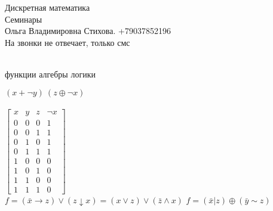 \documentclass[a4paper]{article}
\begin{document}
    \begin{center} 
        \LARGE Дискретная математика\\
        \LARGE Семинары\\
        Ольга Владимировна Стихова. +79037852196\\
        На звонки не отвечает, только смс
    \end{center}
    \newpage
    \begin{center}
        \\
         функции алгебры логики
    \end{center}
    $(x+ \lnot y)~(z\oplus\lnot x)$\\\\
    $\begin{bmatrix}
        x&y&z&\lnot x\\
        0&0&0&1\\
        0&0&1&1\\
        0&1&0&1\\
        0&1&1&1\\
        1&0&0&0\\
        1&0&1&0\\
        1&1&0&0\\
        1&1&1&0
    \end{bmatrix}$\\
    $f=(\bar x\to z)\vee(z \downarrow x)=(x\vee z)\vee(\bar z \wedge x )$
    $f=(\bar x | z)\oplus(\bar y \sim z)$
\end{document}
